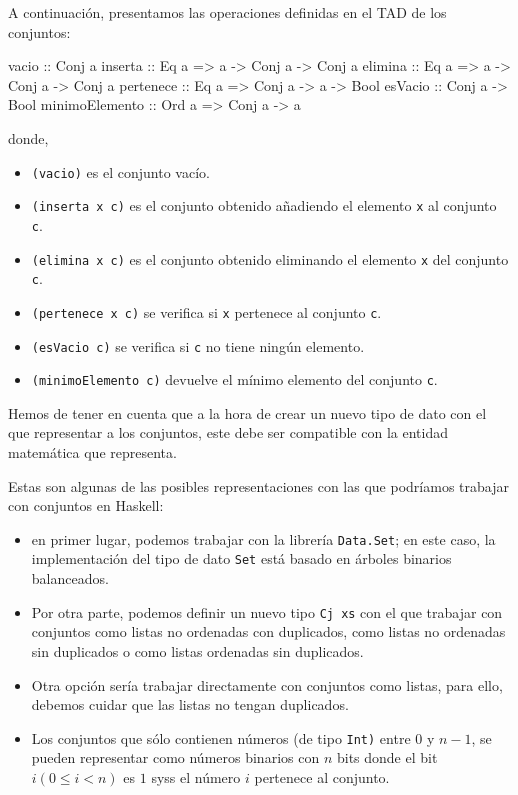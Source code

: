 A continuación, presentamos las operaciones definidas en el TAD de los 
conjuntos:

\begin{code}
vacio          :: Conj a                         
inserta        :: Eq a => a -> Conj a -> Conj a
elimina        :: Eq a => a -> Conj a -> Conj a
pertenece      :: Eq a => Conj a -> a -> Bool  
esVacio        :: Conj a -> Bool
minimoElemento :: Ord a => Conj a -> a
\end{code}

donde,

\begin{itemize}
\item \texttt{(vacio)} es el conjunto vacío.
\item \texttt{(inserta x c)} es el conjunto obtenido añadiendo el      
      elemento \texttt{x} al conjunto \texttt{c}.
\item \texttt{(elimina x c)} es el conjunto obtenido eliminando el
      elemento \texttt{x} del conjunto \texttt{c}.
\item \texttt{(pertenece x c)} se verifica si \texttt{x} pertenece al
      conjunto \texttt{c}.
\item \texttt{(esVacio c)} se verifica si \texttt{c} no tiene ningún
      elemento.
\item \texttt{(minimoElemento c)} devuelve el mínimo elemento del      
      conjunto \texttt{c}.
\end{itemize}

Hemos de tener en cuenta que a la hora de crear un nuevo tipo de dato 
con el que representar a los conjuntos, este debe ser compatible con 
la entidad matemática que representa.

Estas son algunas de las posibles representaciones con las que podríamos
trabajar con conjuntos en Haskell:

\begin{itemize}
  \item en primer lugar, podemos trabajar con la librería  
        \texttt{Data.Set}; en este caso, la implementación del tipo de 
        dato \texttt{Set} está basado en árboles binarios balanceados.
  \item Por otra parte, podemos definir un nuevo tipo \texttt{Cj xs} con  
        el que trabajar con conjuntos como listas no ordenadas con        
        duplicados, como listas no ordenadas sin duplicados o como        
        listas ordenadas sin duplicados.
  \item Otra opción sería trabajar directamente con conjuntos como  
        listas, para ello, debemos cuidar que las listas no tengan        
        duplicados.
  \item Los conjuntos que sólo contienen números (de tipo \texttt{Int)} 
        entre $0$ y $n-1$, se pueden representar como números binarios 
        con $n$ bits donde el bit $i (0 ≤ i < n)$ es $1$ syss el número
        $i$ pertenece al conjunto.
\end{itemize}

